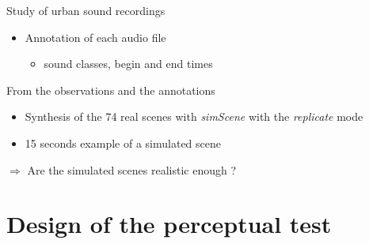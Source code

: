 \documentclass{beamer}
\begin{document}
\begin{frame}{Study of urban sound recordings}
\begin{itemize}
	\item Annotation of each audio file
	\begin{itemize}
		\item sound classes, begin and end times
	\end{itemize}


\end{itemize}

\begin{block}{From the observations and the annotations}
\begin{itemize}
	\item Synthesis of the 74 real scenes with \textit{simScene} with the \textit{replicate} mode
	\item 15 seconds example of a simulated scene\\

\centering
{}

\end{itemize}
\end{block}
\vspace{0.5cm}
$\Rightarrow$ Are the simulated scenes realistic enough ?

\end{frame}


\section{Design of the perceptual test}
\end{document}
